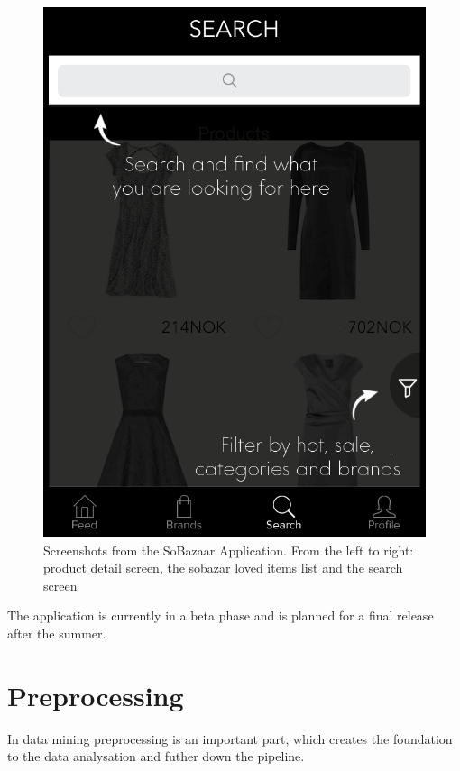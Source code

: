 \begin{figure}[H]
\begin{minipage}{.3\linewidth}
				  \includegraphics[height=1.5\linewidth]{image/SoBazaarsearch.png}
			\end{minipage}
			\caption[SoBazaar functionality screenshots - version 0.5.1]{Screenshots from the SoBazaar Application. From the left to right: product detail screen, the sobazar loved items list and the search screen}
			\label{figure:SoBazaarfeed}
	\end{figure}

	The application is currently in a beta phase and is planned for a final release after the summer.

\section{Preprocessing}
    \label{sec:preprocessing}
    In data mining preprocessing is an important part, which creates the foundation to the data analysation  and futher down the pipeline.

